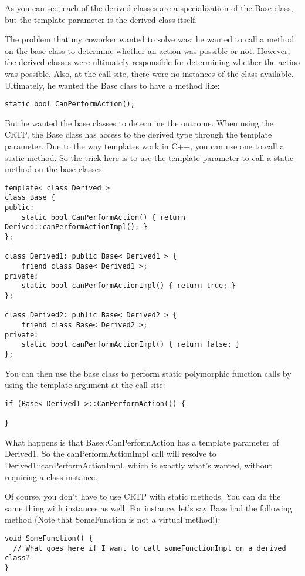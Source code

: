 \documentclass{book}
\begin{document}
As you can see, each of the derived classes are a specialization of the Base class, but the template parameter is the derived class itself.

The problem that my coworker wanted to solve was: he wanted to call a method on the base class to determine whether an action was possible or not. 
However, the derived classes were ultimately responsible for determining whether the action was possible.
Also, at the call site, there were no instances of the class available. 
Ultimately, he wanted the Base class to have a method like:
\begin{lstlisting}
static bool CanPerformAction();
\end{lstlisting}

But he wanted the base classes to determine the outcome. When using the CRTP, the Base class has access to the derived type through the template parameter.
Due to the way templates work in C++, you can use one to call a static method. So the trick here is to use the template parameter to call a static method on the base classes.
\begin{lstlisting}
template< class Derived >
class Base {
public:
    static bool CanPerformAction() { return Derived::canPerformActionImpl(); }
};
 
class Derived1: public Base< Derived1 > {
    friend class Base< Derived1 >;
private:
    static bool canPerformActionImpl() { return true; }
};
 
class Derived2: public Base< Derived2 > {
    friend class Base< Derived2 >;
private:
    static bool canPerformActionImpl() { return false; }
};
\end{lstlisting}

You can then use the base class to perform static polymorphic function calls by using the template argument at the call site:
\begin{lstlisting}
if (Base< Derived1 >::CanPerformAction()) {
 
}
\end{lstlisting}

What happens is that Base::CanPerformAction has a template parameter of Derived1. 
So the canPerformActionImpl call will resolve to Derived1::canPerformActionImpl, which is exactly what’s wanted, without requiring a class instance.

Of course, you don’t have to use CRTP with static methods. You can do the same thing with instances as well. 
For instance, let’s say Base had the following method (Note that SomeFunction is not a virtual method!):
\begin{lstlisting}
void SomeFunction() {
  // What goes here if I want to call someFunctionImpl on a derived class?
}
\end{lstlisting}
\end{document}
